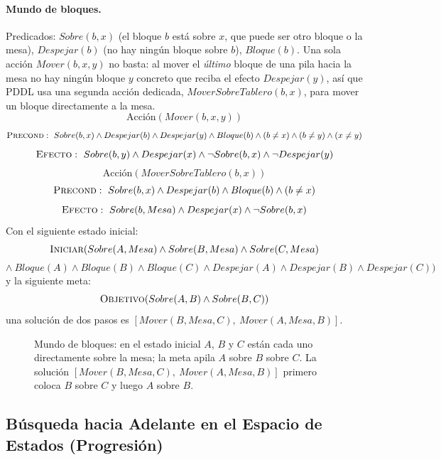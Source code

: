 \paragraph{Mundo de bloques.} Predicados: $Sobre(b,x)$ (el bloque $b$ está sobre $x$, que puede ser
otro bloque o la mesa), $Despejar(b)$ (no hay ningún bloque sobre $b$), $Bloque(b)$. Una sola acción
$Mover(b,x,y)$ no basta: al mover el \emph{último} bloque de una pila hacia la mesa no hay ningún
bloque $y$ concreto que reciba el efecto $Despejar(y)$, así que PDDL usa una segunda acción dedicada,
$MoverSobreTablero(b,x)$, para mover un bloque directamente a la mesa.
\[
    \text{Acci\'on}(Mover(b,x,y))
\]
\[
    \textsc{Precond}:\ Sobre(b,x)\land Despejar(b)\land Despejar(y)\land Bloque(b)\land
    (b\neq x)\land (b\neq y)\land (x\neq y)
\]
\[
    \textsc{Efecto}:\ Sobre(b,y)\land Despejar(x)\land \neg Sobre(b,x)\land \neg Despejar(y)
\]
\[
    \text{Acci\'on}(MoverSobreTablero(b,x))
\]
\[
    \textsc{Precond}:\ Sobre(b,x)\land Despejar(b)\land Bloque(b)\land (b\neq x)
\]
\[
    \textsc{Efecto}:\ Sobre(b,Mesa)\land Despejar(x)\land \neg Sobre(b,x)
\]
Con el siguiente estado inicial:
\[
    \textsc{Iniciar}(Sobre(A,Mesa)\land Sobre(B,Mesa)\land Sobre(C,Mesa)
\]
\[
    \land\ Bloque(A)\land Bloque(B)\land Bloque(C)\land Despejar(A)\land Despejar(B)\land
    Despejar(C))
\]
y la siguiente meta:
\[
    \textsc{Objetivo}(Sobre(A,B)\land Sobre(B,C))
\]
una solución de dos pasos es $[Mover(B,Mesa,C),\ Mover(A,Mesa,B)]$.

\begin{figure}[H]
\centering
{}
\caption{Mundo de bloques: en el estado inicial $A$, $B$ y $C$ están cada uno directamente sobre la
mesa; la meta apila $A$ sobre $B$ sobre $C$. La solución $[Mover(B,Mesa,C),\ Mover(A,Mesa,B)]$ primero
coloca $B$ sobre $C$ y luego $A$ sobre $B$.}
\end{figure}

\subsection{Búsqueda hacia Adelante en el Espacio de Estados (Progresión)}

